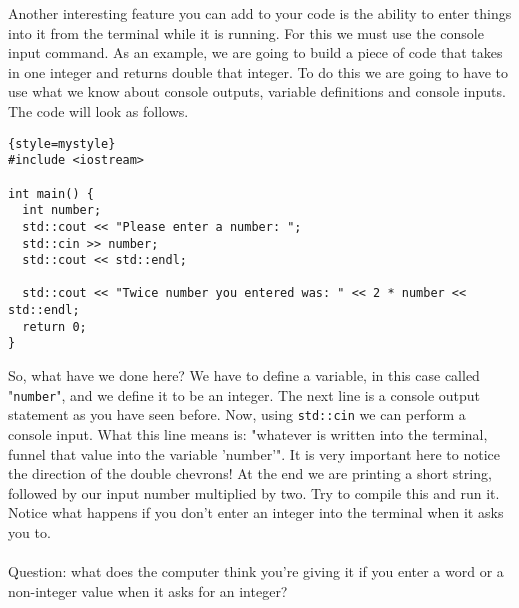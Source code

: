 Another interesting feature you can add to your code is the ability to enter things into it from the terminal while it is running.
For this we must use the console input command.
As an example, we are going to build a piece of code that takes in one integer and returns double that integer.
To do this we are going to have to use what we know about console outputs, variable definitions and console inputs.
The code will look as follows.
\begin{lstlisting}{style=mystyle}
#include <iostream>

int main() {
  int number;
  std::cout << "Please enter a number: ";
  std::cin >> number;
  std::cout << std::endl;
  
  std::cout << "Twice number you entered was: " << 2 * number << std::endl;
  return 0;
}
\end{lstlisting}
So, what have we done here?
We have to define a variable, in this case called "\texttt{number}", and we define it to be an integer.
The next line is a console output statement as you have seen before.
Now, using \texttt{std::cin} we can perform a console input. 
What this line means is: "whatever is written into the terminal, funnel that value into the variable 'number'".
It is very important here to notice the direction of the double chevrons!
At the end we are printing a short string, followed by our input number multiplied by two.
Try to compile this and run it. 
Notice what happens if you don't enter an integer into the terminal when it asks you to. \\
\\
\noindent Question: what does the computer think you're giving it if you enter a word or a non-integer value when it asks for an integer?

